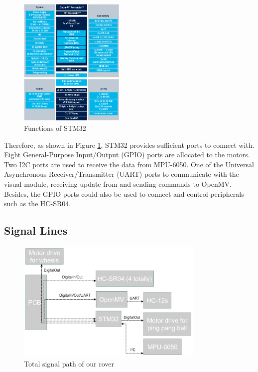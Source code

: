 \documentclass[12pt, a4paper, oneside]{report}
\begin{document}
\begin{figure}[H]
  \centering
  \includegraphics[width=0.45\textwidth]{pic/Motor Drive/16.png}
  \caption{Functions of STM32}
  \label{fig:mt6}
\end{figure}

Therefore, as shown in Figure \ref{fig:mt6}, STM32 provides sufficient ports to connect with. Eight General-Purpose Input/Output (GPIO) ports are allocated to the motors. Two I2C ports are used to receive the data from MPU-6050. One of the Universal Asynchronous Receiver/Transmitter (UART) ports to communicate with the visual module, receiving update from and sending commands to OpenMV. Besides, the GPIO ports could also be used to connect and control peripherals such as the HC-SR04.

\subsection{Signal Lines}
\begin{figure}[H]
  \centering
  \includegraphics[width=0.8\textwidth]{pic/Motor Drive/17.png}
  \caption{Total signal path of our rover}
  \label{fig:mt7}
\end{figure}
\end{document}
